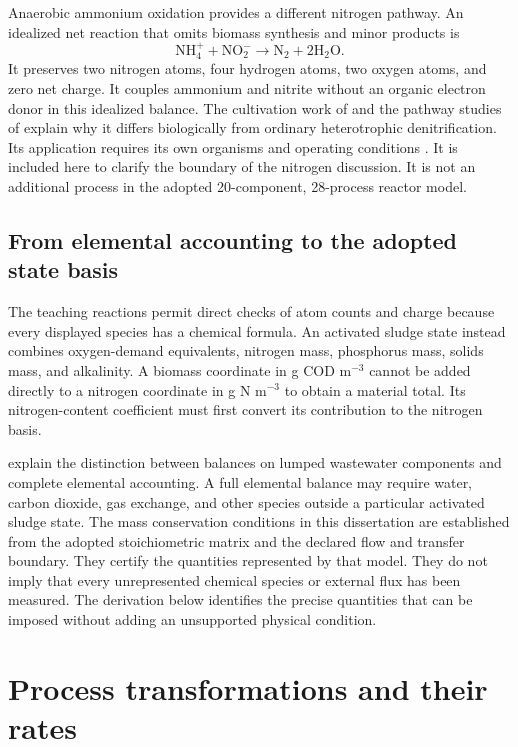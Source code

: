 Anaerobic ammonium oxidation provides a different nitrogen pathway. An idealized net reaction that omits biomass synthesis and minor products is
\begin{equation}
\mathrm{NH_4^+}+\mathrm{NO_2^-}
\longrightarrow\mathrm{N_2}+2\mathrm{H_2O}.
\label{eq:teaching_anammox}
\end{equation}
It preserves two nitrogen atoms, four hydrogen atoms, two oxygen atoms, and zero net charge. It couples ammonium and nitrite without an organic electron donor in this idealized balance. The cultivation work of \citet{Strous1998} and the pathway studies of \citet{Dietl2015,Maalcke2016} explain why it differs biologically from ordinary heterotrophic denitrification. Its application requires its own organisms and operating conditions \citep{Vandekerckhove2018,Xie2021,WinklerStraka2019}. It is included here to clarify the boundary of the nitrogen discussion. It is not an additional process in the adopted 20-component, 28-process reactor model.

\subsection{From elemental accounting to the adopted state basis}

The teaching reactions permit direct checks of atom counts and charge because every displayed species has a chemical formula. An activated sludge state instead combines oxygen-demand equivalents, nitrogen mass, phosphorus mass, solids mass, and alkalinity. A biomass coordinate in g COD m$^{-3}$ cannot be added directly to a nitrogen coordinate in g N m$^{-3}$ to obtain a material total. Its nitrogen-content coefficient must first convert its contribution to the nitrogen basis.

\citet{TakacsVanrolleghem2006} explain the distinction between balances on lumped wastewater components and complete elemental accounting. A full elemental balance may require water, carbon dioxide, gas exchange, and other species outside a particular activated sludge state. The mass conservation conditions in this dissertation are established from the adopted stoichiometric matrix and the declared flow and transfer boundary. They certify the quantities represented by that model. They do not imply that every unrepresented chemical species or external flux has been measured. The derivation below identifies the precise quantities that can be imposed without adding an unsupported physical condition.

\section{Process transformations and their rates}

